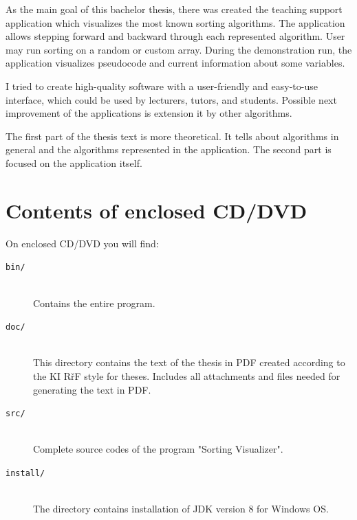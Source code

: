 \documentclass[
  field=inf,
  biblatex,
  language=english,
  glossaries,
  theorems=false,
  sourcecodes=false,
  index
]{kidiplom}
\begin{document}
\begin{kiconclusions}[english]
As the main goal of this bachelor thesis, there was created the teaching support application which visualizes the most known sorting algorithms. The application allows stepping forward and backward through each represented algorithm. User may run sorting on a random or custom array. During the demonstration run, the application visualizes pseudocode and current information about some variables.

I tried to create high-quality software with a user-friendly and easy-to-use interface, which could be used by lecturers, tutors, and students. Possible next improvement of the applications is extension it by other algorithms.

The first part of the thesis text is more theoretical. It tells about algorithms in general and the algorithms represented in the application. The second part is focused on the application itself.
\end{kiconclusions}

\appendix

\section{Contents of enclosed CD/DVD} \label{sec:CDcontents}

On enclosed CD/DVD you will find:

\begin{description}

\item[\texttt{bin/}] \hfill \\
Contains the entire program.

\item[\texttt{doc/}] \hfill \\
This directory contains the text of the thesis in PDF created according to the KI RřF style for theses. Includes all attachments and files needed for generating the text in PDF.

\item[\texttt{src/}] \hfill \\
Complete source codes of the program "Sorting Visualizer".

\item[\texttt{install/}] \hfill \\
The directory contains installation of JDK version 8 for Windows OS. 

\end{description}



\printglossary


\nocite{*}
\printbibliography
\end{document}
